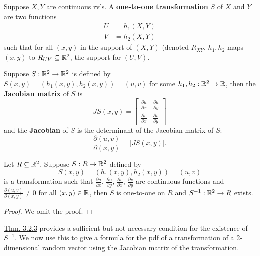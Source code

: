 \documentclass[11pt,fleqn]{book} %
\begin{document}
\begin{definition} 
\label{def:321}
Suppose \(X, Y\) are continuous rv's. A \textbf{one-to-one transformation} \(S\) of \(X\) and \(Y\) are two functions
\[
\begin{aligned}
U &= h_1(X, Y) \\
V &= h_2(X, Y)
\end{aligned}
\]
such that for all \((x, y)\) in the support of \((X, Y)\) (denoted \(R_{XY}\), \(h_1, h_2\) maps \((x, y)\) to \(R_{UV} \subseteq \mathbb{R}^2\), the support for \((U, V)\).
\end{definition}

\begin{definition} \label{def:322}
Suppose \(S:\mathbb{R}^2\rightarrow\mathbb{R}^2\) is defined by \(S(x, y) = (h_1(x, y), h_2(x, y)) = (u, v)\) for some \(h_1, h_2:\mathbb{R}^2\rightarrow\mathbb{R}\), then the \textbf{Jacobian matrix} of \(S\) is
\[
JS(x, y) = \begin{bmatrix}
\frac{\partial u}{\partial x} & \frac{\partial u}{\partial y} \\
\frac{\partial v}{\partial x} & \frac{\partial v}{\partial y}
\end{bmatrix}
\]
and the \textbf{Jacobian} of \(S\) is the determinant of the Jacobian matrix of \(S\):
\[
\frac{\partial(u, v)}{\partial(x, y)} = |JS(x, y)|.
\]
\end{definition}

\begin{theorem}
\label{thm:323}
Let \(R \subseteq \mathbb{R}^2\). Suppose \(S:R \rightarrow \mathbb{R}^2\) defined by 
\[
S(x, y) = (h_1(x, y), h_2(x, y)) = (u, v)
\]
is a transformation such that \(\frac{\partial u}{\partial x}\), \(\frac{\partial u}{\partial y}\), \(\frac{\partial v}{\partial x}\), \(\frac{\partial v}{\partial y}\) are continuous functions and \(\frac{\partial(u, v)}{\partial(x, y)} \neq 0\) for all \((x, y) \in \mathbb{R}\), then \(S\) is one-to-one on \(R\) and \(S^{-1}: \mathbb{R}^2 \rightarrow R\) exists.
\end{theorem}
\begin{proof} We omit the proof. \end{proof}

\begin{remark} \label{rmk:324}
\hyperref[thm:323]{Thm. 3.2.3} provides a sufficient but not necessary condition for the existence of \(S^{-1}\). We now use this to give a formula for the pdf of a transformation of a 2-dimensional random vector using the Jacobian matrix of the transformation.
\end{remark}
\end{document}
